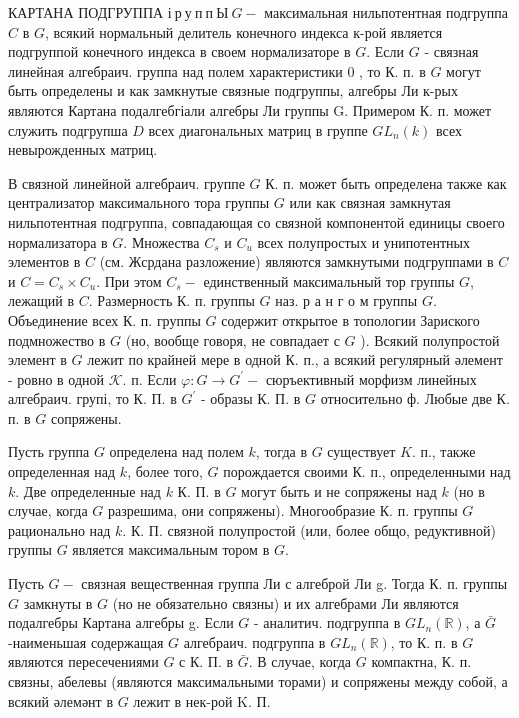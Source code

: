 \documentclass[10pt]{article}
\begin{document}
КАРТАНА ПОДГРУППА $\boldsymbol{і ~ р ~ у ~ п ~ п ~ Ы ~} G-$ максимальная нильпотентная подгруппа $C$ в $G$, всякий нормальный делитель конечного индекса к-рой является подгруппой конечного индекса в своем нормализаторе в $G$. Если $G$ - связная линейная алгебраич. группа над полем характеристики 0 , то К. п. в $G$ могут быть определены и как замкнутые связные подгруппы, алгебры Ли к-рых являются Картана подалгебгіали алгебры Ли группы G. Примером К. п. может служить подгрупша $D$ всех диагональных матриц в группе $G L_{n}(k)$ всех невырожденных матриц.



В связной линейной алгебраич. группе $G$ К. п. может быть определена также как централизатор максимального тора группы $G$ или как связная замкнутая нильпотентная подгруппа, совпадающая со связной компонентой единицы своего нормализатора в $G$. Множества $C_{s}$ и $C_{u}$ всех полупростых и унипотентных элементов в $C$ (см. Жсрдана разложение) являются замкнутыми подгруппами в $C$ и $C=C_{s} \times C_{u}$. При этом $C_{s}-$ единственный максимальный тор группы $G$, лежащий в $C$. Размерность К. п. группы $G$ наз. р а н г о м группы $G$. Объединение всех К. п. группы $G$ содержит открытое в топологии Зариского подмножество в $G$ (но, вообще говоря, не совпадает с $G$ ). Всякий полупростой элемент в $G$ лежит по крайней мере в одной К. п., а всякий регулярный әлемент - ровно в одной $\mathcal{K}$. п. Если $\varphi: G \rightarrow G^{\prime}-$ сюръективный морфизм линейных алгебраич. групі, то К. П. в $G^{\prime}$ - образы К. П. в $G$ относительно ф. Любые две К. п. в $G$ сопряжены.



Пусть группа $G$ определена над полем $k$, тогда в $G$ существует $K$. п., также определенная над $k$, более того, $G$ порождается своими К. п., определенными над $k$. Две определенные над $k$ К. П. в $G$ могут быть и не сопряжены над $k$ (но в случае, когда $G$ разрешима, они сопряжены). Многообразие К. п. группы $G$ рационально над $k$. К. П. связной полупростой (или, более общо, редуктивной) группы $G$ является максимальным тором в $G$.



Пусть $G-$ связная вещественная группа Ли с алгеброй Ли g. Тогда К. п. группы $G$ замкнуты в $G$ (но не обязательно связны) и их алгебрами Ли являются подалгебры Картана алгебры g. Если $G$ - аналитич. подгруппа в $G L_{n}(\mathbb{R})$, а $\bar{G}$-наименьшая содержащая $G$ алгебраич. подгруппа в $G L_{n}(\mathbb{R})$, то К. п. в $G$ являются пересечениями $G$ с К. П. в $\bar{G}$. В случае, когда $G$ компактна, К. п. связны, абелевы (являются максимальными торами) и сопряжены между собой, а всякий әлемәнт в $G$ лежит в нек-рой K. П.
\end{document}

